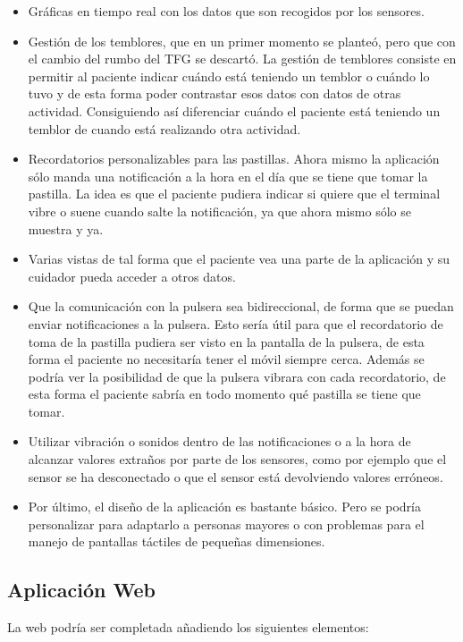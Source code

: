 \documentclass[11pt,spanish]{article}
\begin{document}
\begin{itemize}
	\item Gráficas en tiempo real con los datos que son recogidos por los sensores.
    \item Gestión de los temblores, que en un primer momento se planteó, pero que con el cambio del rumbo del TFG se descartó. La gestión de temblores consiste en permitir al paciente indicar cuándo está teniendo un temblor o cuándo lo tuvo y de esta forma poder contrastar esos datos con datos de otras actividad. Consiguiendo así diferenciar cuándo el paciente está teniendo un temblor de cuando está realizando otra actividad.
    \item Recordatorios personalizables para las pastillas. Ahora mismo la aplicación sólo manda una notificación a la hora en el día que se tiene que tomar la pastilla. La idea es que el paciente pudiera indicar si quiere que el terminal vibre o suene cuando salte la notificación, ya que ahora mismo sólo se muestra y ya.
    \item Varias vistas de tal forma que el paciente vea una parte de la aplicación y su cuidador pueda acceder a otros datos.
    \item Que la comunicación con la pulsera sea bidireccional, de forma que se puedan enviar notificaciones a la pulsera. Esto sería útil para que el recordatorio de toma de la pastilla pudiera ser visto en la pantalla de la pulsera, de esta forma el paciente no necesitaría tener el móvil siempre cerca. Además se podría ver la posibilidad de que la pulsera vibrara con cada recordatorio, de esta forma el paciente sabría en todo momento qué pastilla se tiene que tomar.
    \item Utilizar vibración o sonidos dentro de las notificaciones o a la hora de alcanzar valores extraños por parte de los sensores, como por ejemplo que el sensor se ha desconectado o que el sensor está devolviendo valores erróneos.
    \item Por último, el diseño de la aplicación es bastante básico. Pero se podría personalizar para adaptarlo a personas mayores o con problemas para el manejo de pantallas táctiles de pequeñas dimensiones.
\end{itemize}

\subsection{Aplicación Web}
La web podría ser completada añadiendo los siguientes elementos:
\end{document}
